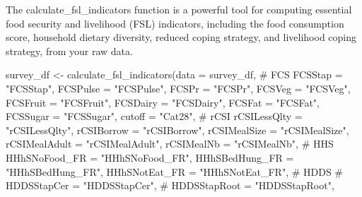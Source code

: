 \documentclass[
  letterpaper,
  DIV=11,
  numbers=noendperiod]{scrreprt}
\newenvironment{Shaded}{\begin{snugshade}}{\end{snugshade}}
\newcommand{\AttributeTok}[1]{\textcolor[rgb]{0.40,0.45,0.13}{#1}}
\newcommand{\CommentTok}[1]{\textcolor[rgb]{0.37,0.37,0.37}{#1}}
\newcommand{\FunctionTok}[1]{\textcolor[rgb]{0.28,0.35,0.67}{#1}}
\newcommand{\NormalTok}[1]{\textcolor[rgb]{0.00,0.23,0.31}{#1}}
\newcommand{\OtherTok}[1]{\textcolor[rgb]{0.00,0.23,0.31}{#1}}
\newcommand{\StringTok}[1]{\textcolor[rgb]{0.13,0.47,0.30}{#1}}
\begin{document}
The calculate\_fsl\_indicators function is a powerful tool for computing
essential food security and livelihood (FSL) indicators, including the
food consumption score, household dietary diversity, reduced coping
strategy, and livelihood coping strategy, from your raw data.

\begin{Shaded}
\begin{Highlighting}[]
\NormalTok{survey\_df }\OtherTok{\textless{}{-}} \FunctionTok{calculate\_fsl\_indicators}\NormalTok{(}\AttributeTok{data =}\NormalTok{ survey\_df,}
                                 \CommentTok{\# FCS}
                                 \AttributeTok{FCSStap =} \StringTok{"FCSStap"}\NormalTok{, }
                                 \AttributeTok{FCSPulse =} \StringTok{"FCSPulse"}\NormalTok{, }
                                 \AttributeTok{FCSPr =} \StringTok{"FCSPr"}\NormalTok{, }
                                 \AttributeTok{FCSVeg =} \StringTok{"FCSVeg"}\NormalTok{, }
                                 \AttributeTok{FCSFruit =} \StringTok{"FCSFruit"}\NormalTok{,}
                                 \AttributeTok{FCSDairy =} \StringTok{"FCSDairy"}\NormalTok{, }
                                 \AttributeTok{FCSFat =} \StringTok{"FCSFat"}\NormalTok{, }
                                 \AttributeTok{FCSSugar =} \StringTok{"FCSSugar"}\NormalTok{, }
                                 \AttributeTok{cutoff =} \StringTok{"Cat28"}\NormalTok{, }
                                 \CommentTok{\# rCSI}
                                 \AttributeTok{rCSILessQlty =} \StringTok{"rCSILessQlty"}\NormalTok{, }
                                 \AttributeTok{rCSIBorrow =} \StringTok{"rCSIBorrow"}\NormalTok{, }
                                 \AttributeTok{rCSIMealSize =} \StringTok{"rCSIMealSize"}\NormalTok{, }
                                 \AttributeTok{rCSIMealAdult =} \StringTok{"rCSIMealAdult"}\NormalTok{, }
                                 \AttributeTok{rCSIMealNb =} \StringTok{"rCSIMealNb"}\NormalTok{,}
                                 \CommentTok{\# HHS}
                                 \AttributeTok{HHhSNoFood\_FR =} \StringTok{"HHhSNoFood\_FR"}\NormalTok{, }
                                 \AttributeTok{HHhSBedHung\_FR =} \StringTok{"HHhSBedHung\_FR"}\NormalTok{, }
                                 \AttributeTok{HHhSNotEat\_FR =} \StringTok{"HHhSNotEat\_FR"}\NormalTok{, }
                                 \CommentTok{\# HDDS}
                                 \CommentTok{\# HDDSStapCer = "HDDSStapCer", }
                                 \CommentTok{\# HDDSStapRoot = "HDDSStapRoot", }

\end{Highlighting}
\end{Shaded}
\end{document}
